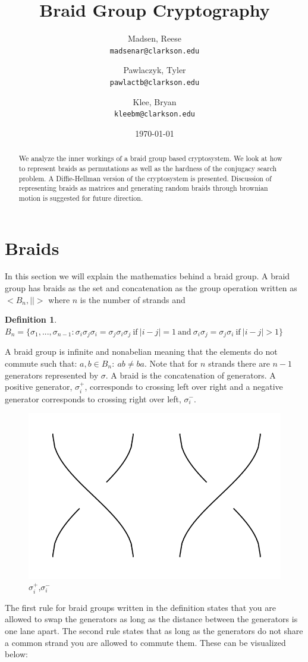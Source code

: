 \documentclass{article}
\title{Braid Group Cryptography}
\author{
  Madsen, Reese\\
  \texttt{madsenar@clarkson.edu}
  \and
  Pawlaczyk, Tyler\\
  \texttt{pawlactb@clarkson.edu}
   \and
  Klee, Bryan\\
  \texttt{kleebm@clarkson.edu}
}
\date{\today}
\theoremstyle{definition}
\newtheorem{definition}{Definition}[section]
\begin{document}
	\maketitle

	\begin{abstract}
	We analyze the inner workings of a braid group based cryptosystem. We look at how to represent braids as permutations as well as the hardness of the conjugacy search problem. A Diffie-Hellman version of the cryptosystem is presented. Discussion of representing braids as matrices and generating random braids through brownian motion is suggested for future direction. 
	\end{abstract}
	\newpage
	\section{Braids}
	In this section we will explain the mathematics behind a braid group. A braid group has braids as the set and concatenation as the group operation written as $<B_n,||>$ where $n$ is the number of strands and 

\begin{definition} 
$B_n=\{\sigma_1,...,\sigma_{n-1}:\sigma_i\sigma_j\sigma_i=\sigma_j\sigma_i\sigma_j\ \textrm{if}\ |i-j|=1\ \textrm{and}\ \sigma_i\sigma_j=\sigma_j\sigma_i\ \textrm{if}\ |i-j|>1\}$
\end{definition}
 
A braid group is infinite and nonabelian meaning that the elements do not commute such that:
$a,b \in B_n: \ ab\neq ba$. Note that for $n$ strands there are $n-1$ generators represented by $\sigma$. A braid is the concatenation of generators. A positive generator, $\sigma_i^+$, corresponds to crossing left over right and a negative generator corresponds to crossing right over left, $\sigma_i^-$. 

\begin{figure}[hbp!]
\centering
  \includegraphics[width=0.2\linewidth]{./Pictures/gen_pos_neg.png}
  \caption{$\sigma_i^+$,$\sigma_i^-$}\label{fig:graph}
\end{figure}

The first rule for braid groups written in the definition states that you are allowed to swap the generators as long as the distance between the generators is one lane apart. The second rule states that as long as the generators do not share a common strand you are allowed to commute them. These can be visualized below:
\end{document}
